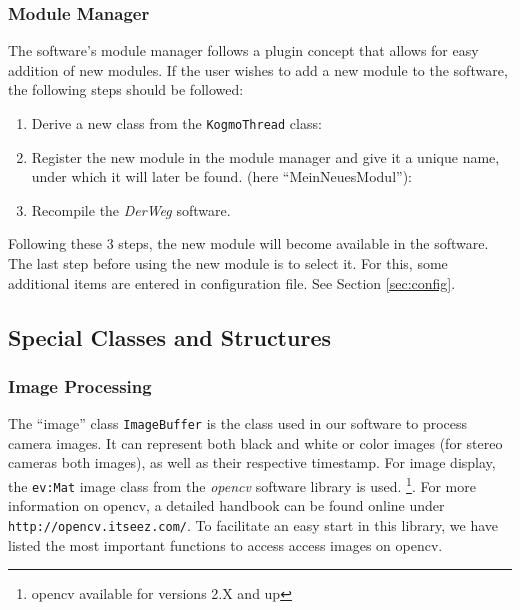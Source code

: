 \documentclass[a4paper, 11pt]{article}
\newcommand{\code}[1]{\texttt{#1}}
\newcommand{\codeex}[2][0.98\textwidth]{\vspace*{1ex}\noindent\fbox{\parbox{#1}{}}\vspace*{1ex}}
\newcommand{\DerWeg}{\textit{DerWeg }} %
\begin{document}
\subsubsection{Module Manager}
The software’s module manager follows a plugin concept that allows for easy addition of new modules. If the user wishes to add a new module to the software, the following steps should be followed:
\begin{enumerate}
\item Derive a new class from the \code{KogmoThread} class:

\codeex[0.9\textwidth]{beispielModulAbleiten.cpp}

\item Register the new module in the module manager and give it a unique name, under which it will later be found. (here “MeinNeuesModul”):

\codeex[0.9\textwidth]{beispielModulAnmelden.cpp}

\item Recompile the \DerWeg software.
\end{enumerate}
 Following these 3 steps, the new module will become available in the software. The last step before using the new module is to select it. For this, some additional items are entered in configuration file. See Section \ref{sec:config}.

\subsection{Special Classes and Structures}

\subsubsection{Image Processing}

The “image” class \code{ImageBuffer} is the class used in our software to process camera images. It can represent both black and white or color images (for stereo cameras both images), as well as their respective timestamp. For image display, the \texttt{ev:Mat} image class from the \textit{opencv} software library is used. \footnote{opencv available for versions 2.X and up}. For more information on opencv, a detailed handbook can be found online under \texttt{http://opencv.itseez.com/}. To facilitate an easy start in this library, we have listed the most important functions to access access images on opencv.
\end{document}
